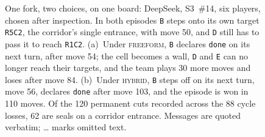 \begin{figure}[tbp]
    \centering
    \caption[One fork, two choices]{One fork, two choices, on one board: DeepSeek, S3~\#14, six players, chosen after inspection. In both episodes \texttt{B} steps onto its own target \texttt{R5C2}, the corridor's single entrance, with move 50, and \texttt{D} still has to pass it to reach \texttt{R1C2}. (a)~Under \textsc{freeform}, \texttt{B} declares \texttt{done} on its next turn, after move 54; the cell becomes a wall, \texttt{D} and \texttt{E} can no longer reach their targets, and the team plays 30 more moves and loses after move 84. (b)~Under \textsc{hybrid}, \texttt{B} steps off on its next turn, move 56, declares \texttt{done} after move 103, and the episode is won in 110 moves. Of the 120 permanent cuts recorded across the 88 cycle losses, 62 are seals on a corridor entrance. Messages are quoted verbatim; \ldots{} marks omitted text.}
    \label{fig:cut-corridor}
\end{figure}
